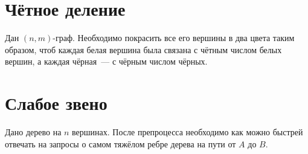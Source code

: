 \documentclass[addpoints]{exam}
\begin{document}
\section{Чётное деление}

Дан $(n,m)$-граф. Необходимо покрасить все его вершины в два цвета таким образом, чтоб каждая белая вершина была связана с чётным числом белых вершин, а каждая чёрная~--- с чёрным числом чёрных.

\section{Слабое звено}

Дано дерево на $n$ вершинах. После препроцесса необходимо как можно быстрей отвечать на запросы о самом тяжёлом ребре дерева на пути от $A$ до $B$.
\end{document}
